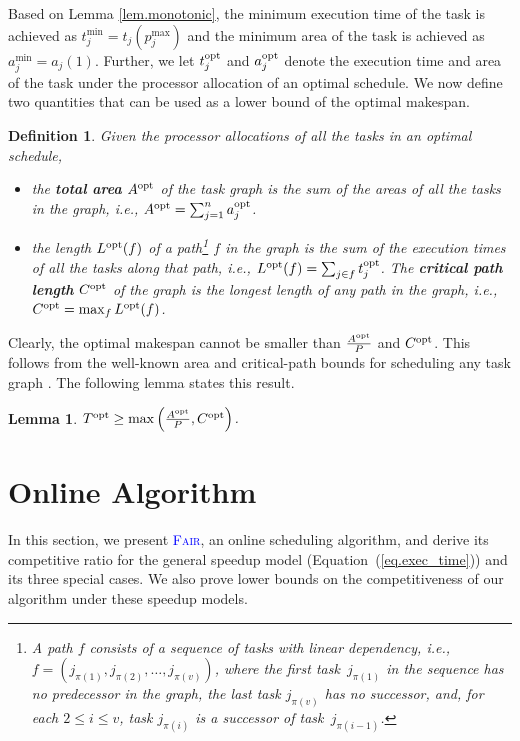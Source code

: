 \documentclass{article}
\newtheorem{lemma}{Lemma}
\newtheorem{definition}{Definition}
\newcommand\fair{\textsc{Fair}\xspace}
\newcommand\opt{\textnormal{opt}\xspace}
\newcommand{\new}[1]{\textcolor{blue}{#1}}
\newcommand{\LP}[2][inline]{\todo[color=green!50,#1]{\sf \textbf{Lucas:} #2}
\xspace}
\begin{document}
Based on Lemma \ref{lem.monotonic}, the minimum execution time of the task is achieved as $t_j^{\min} = t_j(p_j^{\max})$ and the minimum area of the task is achieved as $a_j^{\min} = a_j(1)$.
Further, we let $t_j^{\opt}$ and $a_j^{\opt}$ denote the execution time and area of the task under the processor allocation of an optimal schedule.
We now define two quantities that can be used as a lower bound of the optimal makespan.

\begin{definition}
Given the processor allocations of all the tasks in an optimal schedule,
\begin{itemize}
  \item the \textbf{\emph{total area}} $A^{\opt}$ of the task graph is the sum of the areas of all the tasks in the graph, i.e., $A^{\opt} = \sum_{j=1}^{n} a_j^{\opt}$.
  \item the length $L^{\opt}(f)$ of a path\footnote{A path $f$ consists of a sequence of tasks with linear dependency, i.e., $f = (j_{\pi(1)}, j_{\pi(2)}, \dots, j_{\pi(v)})$, where the first task~$j_{\pi(1)}$ in the sequence has no predecessor in the graph, the last task $j_{\pi(v)}$ has no successor, and, for each $2\le i\le v$, task $j_{\pi(i)}$ is a successor of task~$j_{\pi(i-1)}$.} $f$ in the graph is the sum of the execution times of all the tasks along that path, i.e., $L^{\opt}(f) = \sum_{j\in f}t_j^{\opt}$. The \textbf{\emph{critical path length}} $C^{\opt}$ of the graph is the longest length of any path in the graph, i.e., $C^{\opt} = \max_{f} L^{\opt}(f)$.
\end{itemize}
\end{definition}

Clearly, the optimal makespan cannot be smaller than $\frac{A^{\opt}}{P}$ and $C^{\opt}$. This follows from the well-known area and critical-path bounds for scheduling any task graph \cite{Graham69}.
The following lemma states this result.
\begin{lemma}\label{lem.lower}
$T^{\opt} \ge \max \left(\frac{A^{\opt}}{P}, C^{\opt} \right)$.
\end{lemma}


\section{Online Algorithm}
\label{sec.alg}
\LP{Updated from TOPC Paper}
In this section, we present \new{\fair}, an online scheduling algorithm, and derive its competitive ratio for the general speedup model (Equation~(\ref{eq.exec_time})) and its three special cases. We also prove lower bounds on the competitiveness of our algorithm under these speedup models.
\end{document}
